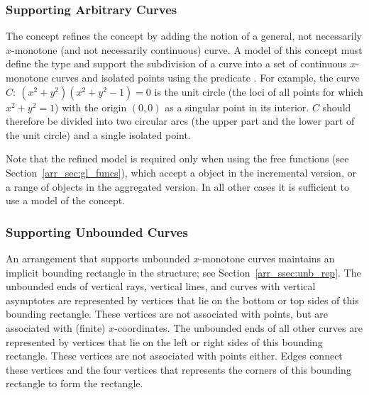 \subsubsection{Supporting Arbitrary Curves
\label{arr_sssec:tr_full_concept}}

The concept  refines the
 concept by adding the notion
of a general, not necessarily $x$-monotone (and not necessarily
continuous) curve. A model of this concept must define the
 type and support the subdivision of a curve into a
set of continuous $x$-monotone curves and isolated points using
the predicate . For example, the curve
$C:\ (x^2 + y^2)(x^2 + y^2 - 1) = 0$ is the unit circle (the loci
of all points for which $x^2 + y^2  = 1$) with the origin $(0,0)$
as a singular point in its interior. $C$ should therefore be
divided into two circular arcs (the upper part and the lower part
of the unit circle) and a single isolated point.

Note that the refined model  is required
only when using the free  functions (see
Section~\ref{arr_sec:gl_funcs}), which accept a  object
in the incremental version, or a range of  objects in the
aggregated version. In all other cases it is sufficient to use a model
of the  concept.

\subsubsection{Supporting Unbounded Curves}
%
An arrangement that supports unbounded $x$-monotone curves maintains
an implicit bounding rectangle in the \dcel{} structure; see
Section~\ref{arr_ssec:unb_rep}. The unbounded ends of vertical rays, 
vertical lines, and curves with vertical asymptotes are represented
by vertices that lie on the bottom or top sides of this bounding
rectangle. These vertices are not associated with points, but are
associated with (finite) $x$-coordinates. The unbounded ends of all
other curves are represented by vertices that lie on the left or
right sides of this bounding rectangle. These vertices are not
associated with points either. Edges connect these vertices and the
four vertices that represents the corners of this bounding rectangle
to form the rectangle.

